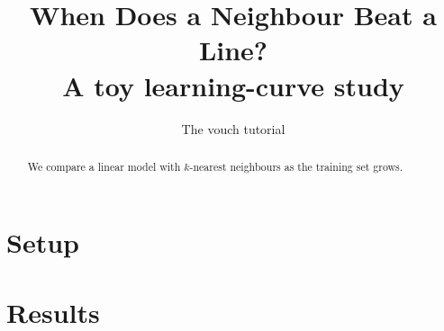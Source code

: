 \documentclass{article}
\title{When Does a Neighbour Beat a Line?\\[2pt] \large A toy learning-curve study}
\author{The vouch tutorial}
\date{}
\begin{document}
\maketitle

\begin{abstract}
We compare a linear model with $k$-nearest neighbours as the training set grows.
\end{abstract}

\section{Setup}

\section{Results}
\end{document}
